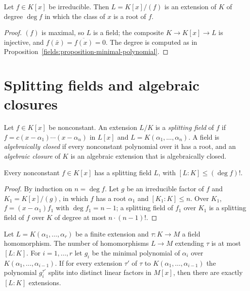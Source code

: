 \begin{proposition}[Kronecker]\label{fields:proposition-kronecker}
Let $f \in K[x]$ be irreducible. Then $L = K[x]/(f)$ is an extension of $K$ of degree
$\deg f$ in which the class of $x$ is a root of $f$.
\end{proposition}

\begin{proof}
$(f)$ is maximal, so $L$ is a field; the composite $K \to K[x] \to L$ is injective, and
$f(\bar x) = \overline{f(x)} = 0$. The degree is computed as in
Proposition~\ref{fields:proposition-minimal-polynomial}.
\end{proof}

\section{Splitting fields and algebraic closures}\label{fields:section-splitting}

\begin{definition}\label{fields:definition-splitting-field}
Let $f \in K[x]$ be nonconstant. An extension $L/K$ is a \emph{splitting field} of $f$ if
$f = c(x - \alpha_1) \cdots (x - \alpha_n)$ in $L[x]$ and $L = K(\alpha_1, \ldots, \alpha_n)$. A field is
\emph{algebraically closed} if every nonconstant polynomial over it has a root, and an
\emph{algebraic closure} of $K$ is an algebraic extension that is algebraically closed.
\end{definition}

\begin{proposition}\label{fields:proposition-splitting-exists}
Every nonconstant $f \in K[x]$ has a splitting field $L$, with $[L : K] \leq (\deg f)!$.
\end{proposition}

\begin{proof}
By induction on $n = \deg f$. Let $g$ be an irreducible factor of $f$ and
$K_1 = K[x]/(g)$, in which $f$ has a root $\alpha_1$ and $[K_1 : K] \leq n$. Over $K_1$,
$f = (x - \alpha_1) f_1$ with $\deg f_1 = n - 1$; a splitting field of $f_1$ over $K_1$ is a
splitting field of $f$ over $K$ of degree at most $n \cdot (n-1)!$.
\end{proof}

\begin{theorem}\label{fields:theorem-extension}
Let $L = K(\alpha_1, \ldots, \alpha_r)$ be a finite extension and $\tau \colon K \to M$ a field
homomorphism. The number of homomorphisms $L \to M$ extending $\tau$ is at most $[L : K]$.
For $i = 1, \ldots, r$ let $g_i$ be the minimal polynomial of $\alpha_i$ over
$K(\alpha_1, \ldots, \alpha_{i-1})$. If for every extension $\tau'$ of $\tau$ to
$K(\alpha_1, \ldots, \alpha_{i-1})$ the polynomial $g_i^{\tau'}$ splits into distinct linear factors
in $M[x]$, then there are exactly $[L : K]$ extensions.
\end{theorem}

